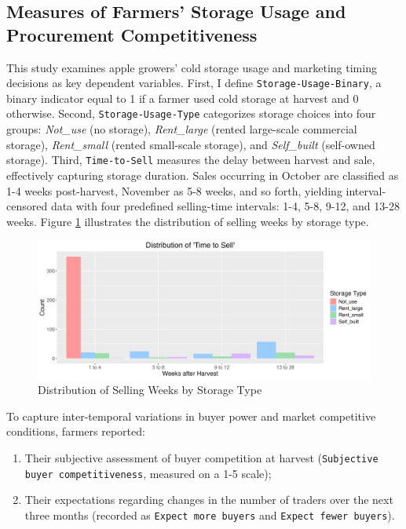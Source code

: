 \subsection{Measures of Farmers' Storage Usage and Procurement Competitiveness}
\noindent This study examines apple growers' cold storage usage and marketing timing decisions as key dependent variables. First, I define \texttt{Storage-Usage-Binary}, a binary indicator equal to 1 if a farmer used cold storage at harvest and 0 otherwise. Second, \texttt{Storage-Usage-Type} categorizes storage choices into four groups: \textit{Not\_use} (no storage), \textit{Rent\_large} (rented large-scale commercial storage), \textit{Rent\_small} (rented small-scale storage), and \textit{Self\_built} (self-owned storage). Third, \texttt{Time-to-Sell} measures the delay between harvest and sale, effectively capturing storage duration. Sales occurring in October are classified as 1-4 weeks post-harvest, November as 5-8 weeks, and so forth, yielding interval-censored data with four predefined selling-time intervals: 1-4, 5-8, 9-12, and 13-28 weeks. Figure \ref{Figure: selling weeks distribution} illustrates the distribution of selling weeks by storage type.  

\begin{figure}[H]
\centering
\includegraphics[width=1\textwidth]{figures/selling_weeks_distribution.png}
\caption{Distribution of Selling Weeks by Storage Type}
\label{Figure: selling weeks distribution}
\end{figure}

To capture inter-temporal variations in buyer power and market competitive conditions, farmers reported:
\begin{enumerate}
    \item Their subjective assessment of buyer competition at harvest (\texttt{Subjective buyer competitiveness}, measured on a 1-5 scale);
    \item Their expectations regarding changes in the number of traders over the next three months (recorded as \texttt{Expect more buyers} and \texttt{Expect fewer buyers}).
\end{enumerate}

